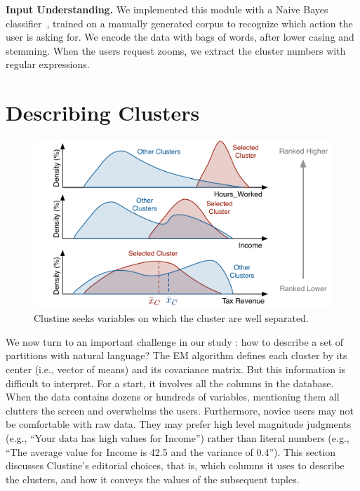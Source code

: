 \textbf{Input Understanding.}  We implemented this module with a Naive Bayes
classifier~\cite{bishop2001bishop}, trained on a manually generated corpus to
recognize which action the user is asking for. We encode the data with bags of
words, after lower casing and stemming.  When the users request zooms, we
extract the cluster numbers with regular expressions.

\section{Describing Clusters}
\label{sec:describingClu}

\begin{figure}[t!]
  \centering
  \includegraphics[width=\columnwidth]{Ranking}
  \caption{Clustine seeks variables on which the cluster are
  well separated.}
  \label{fig:Ranking}
\end{figure}

We now turn to an important challenge in our study : how to describe a set of
partitions with natural language? The EM algorithm defines each cluster by
its center (i.e., vector of means) and its covariance matrix.  But this
information is difficult to interpret. For a start, it involves all the columns
in the database. When the data contains dozens or hundreds of variables,
mentioning them all clutters the screen and overwhelms the users.
Furthermore, novice users may not be comfortable with raw data.  They may
prefer high level magnitude judgments (e.g., ``Your data has high values for
Income'') rather than literal numbers  (e.g., ``The average value for Income is
42.5 and the variance of 0.4''). This section discusses Clustine's editorial
choices, that is, which columns it uses to describe the clusters, and how it
conveys the values of the subsequent tuples.

